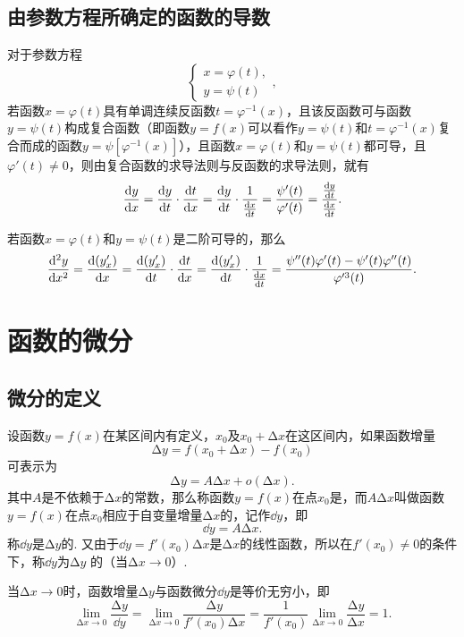 \subsection{由参数方程所确定的函数的导数}
\begin{theorem}
对于参数方程\[
\left\{ \begin{array}{l}
x = \varphi(t), \\
y = \psi(t)
\end{array} \right.,
\]若函数\(x = \varphi(t)\)具有单调连续反函数\(t=\varphi^{-1}(x)\)，且该反函数可与函数\(y = \psi(t)\)构成复合函数（即函数\(y=f(x)\)可以看作\(y=\psi(t)\)和\(t=\varphi^{-1}(x)\)复合而成的函数\(y=\psi[\varphi^{-1}(x)]\)），且函数\(x = \varphi(t)\)和\(y = \psi(t)\)都可导，且\(\varphi'(t) \neq 0\)，则由复合函数的求导法则与反函数的求导法则，就有\[
\dv{y}{x} = \dv{y}{t} \cdot \dv{t}{x}
= \dv{y}{t} \cdot \frac{1}{\dv{x}{t}}
= \frac{\psi'(t)}{\varphi'(t)}
= \frac{\dv{y}{t}}{\dv{x}{t}}.
\]

若函数\(x = \varphi(t)\)和\(y = \psi(t)\)是二阶可导的，那么\[
\dv[2]{y}{x} = \dv{(y'_x)}{x} = \dv{(y'_x)}{t} \cdot \dv{t}{x}
= \dv{(y'_x)}{t} \cdot \frac{1}{\dv{x}{t}}
= \frac{\psi''(t) \varphi'(t) - \psi'(t) \varphi''(t)}{\varphi'^3(t)}.
\]
\end{theorem}

\section{函数的微分}
\subsection{微分的定义}
\begin{definition}
设函数\(y=f(x)\)在某区间内有定义，\(x_0\)及\(x_0+\increment x\)在这区间内，如果函数增量\[
\increment y=f(x_0+\increment x)-f(x_0)
\]可表示为\[
\increment y=A\increment x+o(\increment x).
\]其中\(A\)是不依赖于\(\increment x\)的常数，那么称函数\(y=f(x)\)在点\(x_0\)是，而\(A\increment x\)叫做函数\(y=f(x)\)在点\(x_0\)相应于自变量增量\(\increment x\)的，记作\(\dd{y}\)，即\[
\dd{y}=A\increment x.
\]称\(\dd{y}\)是\(\increment y\)的.
又由于\(\dd{y}=f'(x_0)\increment x\)是\(\increment x\)的线性函数，所以在\(f'(x_0) \neq 0\)的条件下，称\(\dd{y}\)为\(\increment y\) 的（当\(\increment x\to0\)）.
\end{definition}

\begin{property}
当\(\increment x\to0\)时，函数增量\(\increment y\)与函数微分\(\dd{y}\)是等价无穷小，即\[
\lim\limits_{\increment x\to0} \frac{\increment y}{\dd{y}}
= \lim\limits_{\increment x\to0} \frac{\increment y}{f'(x_0) \increment x}
= \frac{1}{f'(x_0)} \lim\limits_{\increment x\to0} \frac{\increment y}{\increment x}
= 1.
\]
\end{property}

